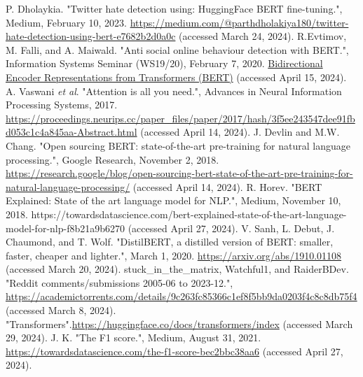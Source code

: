 \documentclass[conference]{IEEEtran}
\begin{document}
\begin{thebibliography}{00}
 P. Dholaykia. "Twitter hate detection using: HuggingFace BERT fine-tuning.", Medium, February 10, 2023. \href{https://medium.com/@parthdholakiya180/twitter-hate-detection-using-bert-e7682b2d0a0c}{https://medium.com/@parthdholakiya180/twitter-hate-detection-using-bert-e7682b2d0a0c} (accessed March 24, 2024).
 R.Evtimov, M. Falli, and A. Maiwald. "Anti social online behaviour detection with BERT.", Information Systems Seminar (WS19/20), February 7, 2020. \href{https://humboldt-wi.github.io/blog/research/information_systems_1920/bert_blog_post/#}{Bidirectional Encoder Representations from Transformers (BERT)} (accessed April 15, 2024).
 A. Vaswani \textit{et al}. "Attention is all you need.", Advances in Neural Information Processing Systems, 2017. \href{https://proceedings.neurips.cc/paper_files/paper/2017/hash/3f5ee243547dee91fbd053c1c4a845aa-Abstract.html}{https://proceedings.neurips.cc/paper_files/paper/2017/hash/3f5ee243547dee91fbd053c1c4a845aa-Abstract.html} (accessed April 14, 2024).
 J. Devlin and M.W. Chang. "Open sourcing BERT: state-of-the-art pre-training for natural language processing.", Google Research, November 2, 2018. \href{https://research.google/blog/open-sourcing-bert-state-of-the-art-pre-training-for-natural-language-processing/}{https://research.google/blog/open-sourcing-bert-state-of-the-art-pre-training-for-natural-language-processing/} (accessed April 14, 2024). 
 R. Horev. "BERT Explained: State of the art language model for NLP.", Medium, November 10, 2018. https://towardsdatascience.com/bert-explained-state-of-the-art-language-model-for-nlp-f8b21a9b6270 (accessed April 27, 2024).
V. Sanh, L. Debut, J. Chaumond, and T. Wolf. "DistilBERT, a distilled version of BERT: smaller, faster, cheaper and lighter.", March 1, 2020. \href{https://arxiv.org/abs/1910.01108}{https://arxiv.org/abs/1910.01108} (accessed March 20, 2024). 
 stuck_in_the_matrix, Watchful1, and RaiderBDev. "Reddit comments/submissions 2005-06 to 2023-12.", \href{https://academictorrents.com/details/9c263fc85366c1ef8f5bb9da0203f4c8c8db75f4}{https://academictorrents.com/details/9c263fc85366c1ef8f5bb9da0203f4c8c8db75f4} (accessed March 8, 2024).
 "Transformers".\href{https://huggingface.co/docs/transformers/index}{https://huggingface.co/docs/transformers/index} (accessed March 29, 2024).
 J. K. "The F1 score.", Medium, August 31, 2021. \href{https://towardsdatascience.com/the-f1-score-bec2bbc38aa6}{https://towardsdatascience.com/the-f1-score-bec2bbc38aa6} (accessed April 27, 2024).

\end{thebibliography}
\end{document}
